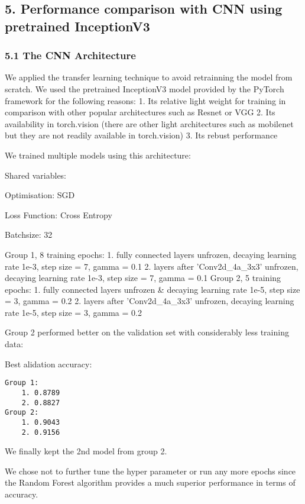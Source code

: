 \documentclass[11pt]{article}
\begin{document}
    \subsection{5. Performance comparison with CNN using pretrained
InceptionV3}\label{performance-comparison-with-cnn-using-pretrained-inceptionv3}

    \subsubsection{5.1 The CNN Architecture}\label{the-cnn-architecture}

    We applied the transfer learning technique to avoid retrainning the
model from scratch. We used the pretrained InceptionV3 model provided by
the PyTorch framework for the following reasons: 1. Its relative light
weight for training in comparison with other popular architectures such
as Resnet or VGG 2. Its availability in torch.vision (there are other
light architectures such as mobilenet but they are not readily available
in torch.vision) 3. Its rebust performance

    We trained multiple models using this architecture:

Shared variables:

Optimisation: SGD

Loss Function: Cross Entropy

Batchsize: 32

Group 1, 8 training epochs: 1. fully connected layers unfrozen, decaying
learning rate 1e-3, step size = 7, gamma = 0.1 2. layers after
'Conv2d\_4a\_3x3' unfrozen, decaying learning rate 1e-3, step size = 7,
gamma = 0.1 Group 2, 5 training epochs: 1. fully connected layers
unfrozen \& decaying learning rate 1e-5, step size = 3, gamma = 0.2 2.
layers after 'Conv2d\_4a\_3x3' unfrozen, decaying learning rate 1e-5,
step size = 3, gamma = 0.2

    Group 2 performed better on the validation set with considerably less
training data:

Best alidation accuracy:

\begin{verbatim}
Group 1:
    1. 0.8789
    2. 0.8827
Group 2:
    1. 0.9043
    2. 0.9156   
\end{verbatim}

    We finally kept the 2nd model from group 2.

We chose not to further tune the hyper parameter or run any more epochs
since the Random Forest algorithm provides a much superior performance
in terms of accuracy.
\end{document}
